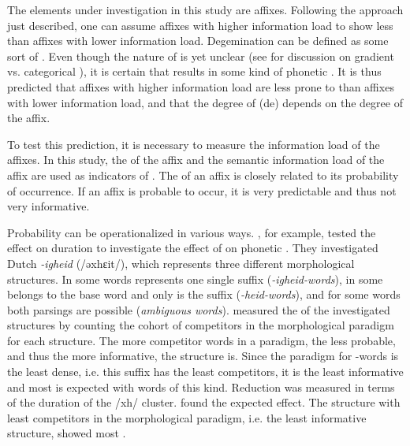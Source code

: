 {{The elements under investigation in this study are affixes. Following the approach just described, one can assume affixes with higher information load to show less  than affixes with lower information load. Degemination can be defined as some sort of . Even though the nature of  is yet unclear (see  for discussion on gradient vs. categorical ), it is certain that  results in some kind of phonetic . It is thus predicted that affixes with higher information load are less prone to  than affixes with lower information load, and that the degree of (de) depends on the degree  of the affix.

To test this prediction, it is necessary to measure the information load of the affixes.
 In this study, the  of the affix and the semantic information load of the affix are used as indicators of .
The  of an affix is closely related to its probability of occurrence. 
 If an affix is probable to occur, it is very predictable and thus not very informative. %

 
 Probability can be operationalized in various ways. 
   \cite{Pluymaekers.2010}, for example, tested the effect  on duration to investigate the effect of  on phonetic .
 They investigated Dutch \textit{-igheid} (/əxhɛit/), which represents three different morphological structures. In some words  represents one single suffix (\textit{\textit{-igheid}-words}), in some  belongs to the base word and only  is the suffix (\textit{-heid-words}), and for some words both parsings are possible (\textit{ambiguous words}). \cite{Pluymaekers.2010} measured the  of the investigated structures by counting the cohort of competitors in the morphological paradigm for each structure. 
 The more competitor words in a paradigm, the less probable, and thus the more informative, the structure is.  Since the paradigm for -words is the least dense, i.e. this suffix has the least competitors, it is the least informative and most  is expected with words of this kind. Reduction was measured in terms of the duration of the /xh/ cluster. \cite{Pluymaekers.2010} found the expected effect. The structure with least competitors in the morphological paradigm, i.e. the least informative structure, showed most .
  
}}
